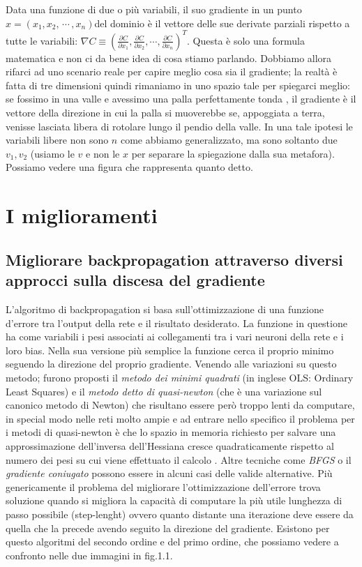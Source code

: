 Data una funzione di due o più variabili, il suo gradiente in un punto $x=(x_{1}, x_{2},\, \cdots \, , x_{n})$del dominio è il vettore delle sue derivate parziali rispetto a tutte le variabili: $\nabla C \equiv (\frac{\partial C}{\partial x_{1}}, \frac{\partial C}{\partial x_{2}}, \cdots, \frac{\partial C}{\partial x_{n}})^{T}$. Questa è solo una formula matematica e non ci da bene idea di cosa stiamo parlando. Dobbiamo allora rifarci ad uno scenario reale per capire meglio cosa sia il gradiente; la realtà è fatta di tre dimensioni quindi rimaniamo in uno spazio tale per spiegarci meglio: se fossimo in una valle e avessimo una palla perfettamente tonda , il gradiente è il vettore della direzione in cui la palla si muoverebbe se, appoggiata a terra, venisse lasciata libera di rotolare lungo il pendio della valle. In una tale ipotesi le variabili libere non sono $n$ come abbiamo generalizzato, ma sono soltanto due $v_{1}, v_{2}$ (usiamo le $v$ e non le $x$ per separare la spiegazione dalla sua metafora). Possiamo vedere una figura che rappresenta quanto detto.

\section*{I miglioramenti}
\subsection*{Migliorare backpropagation attraverso diversi approcci sulla discesa del gradiente}

L'algoritmo di backpropagation si basa sull'ottimizzazione di una funzione d'errore tra l'output della rete e il risultato desiderato. La funzione in questione ha come variabili i pesi associati ai collegamenti tra i vari neuroni della rete e i loro bias. Nella sua versione più semplice la funzione cerca il proprio minimo seguendo la direzione del proprio gradiente.
Venendo alle variazioni su questo metodo; furono proposti il \textit{metodo dei minimi quadrati} (in inglese OLS: Ordinary Least Squares) e il \textit{metodo detto di quasi-newton} (che è una variazione sul canonico metodo di Newton) che risultano essere però troppo lenti da computare, in special modo nelle reti molto ampie e ad entrare nello specifico il problema per i metodi di quasi-newton è che lo spazio in memoria richiesto per salvare una approssimazione dell'inversa dell'Hessiana cresce quadraticamente rispetto al numero dei pesi su cui viene effettuato il calcolo \cite{saito1997partial}. Altre tecniche come \textit{BFGS} o il \textit{gradiente coniugato} possono essere in alcuni casi delle valide alternative.
Più genericamente il problema del migliorare l'ottimizzazione dell'errore trova soluzione quando si migliora la capacità di computare la più utile lunghezza di passo possibile (step-lenght) ovvero quanto distante una iterazione deve essere da quella che la precede avendo seguito la direzione del gradiente.
Esistono per questo algoritmi del secondo ordine e del primo ordine, che possiamo vedere a confronto nelle due immagini in fig.1.1.



